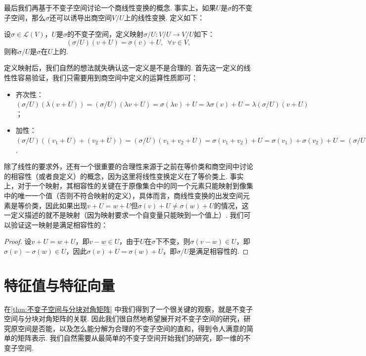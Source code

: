 最后我们再基于不变子空间讨论一个商线性变换的概念. 事实上，如果$U$是$\sigma$的不变子空间，那么$\sigma$还可以诱导出商空间$V/U$上的线性变换. 定义如下：
\begin{definition}{}{}
    设$\sigma\in \mathcal{L}(V)$，$U$是$\sigma$的不变子空间，定义映射$\sigma/U:V/U\to V/U$如下：
    \[(\sigma/U)(v+U)=\sigma(v)+U,\enspace\forall v\in V,\]
    则称$\sigma/U$是$\sigma$在$U$上的.
\end{definition}

定义映射后，我们自然的想法就失确认这一定义是不是合理的. 首先这一定义的线性性容易验证，我们只需要用到商空间中定义的运算性质即可：
\begin{itemize}
    \item 齐次性：$(\sigma/U)(\lambda(v+U))=(\sigma/U)(\lambda v+U)=\sigma(\lambda v)+U=\lambda\sigma(v)+U=\lambda(\sigma/U)(v+U)$；

    \item 加性：$(\sigma/U)((v_1+U)+(v_2+U))=(\sigma/U)(v_1+v_2+U)=\sigma(v_1+v_2)+U=\sigma(v_1)+\sigma(v_2)+U=(\sigma/U)(v_1+U)+(\sigma/U)(v_2+U)$.
\end{itemize}

除了线性的要求外，还有一个很重要的合理性来源于之前在等价类和商空间中讨论的相容性（或者良定义）的概念，因为这里将线性变换定义在了等价类上. 事实上，对于一个映射，其相容性的关键在于原像集合中的同一个元素只能映射到像集中的唯一一个值（否则不符合映射的定义），具体而言，商线性变换的出发空间元素是等价类，因此如果出现$v+U=w+U$但$\sigma(v)+U\neq \sigma(w)+U$的情况，这一定义描述的就不是映射（因为映射要求一个自变量只能映到一个值上）. 我们可以验证这一映射是满足相容性的：

\begin{proof}
    设$v+U=w+U$，即$v-w\in U$，由于$U$在$\sigma$下不变，则$\sigma(v-w)\in U$，即$\sigma(v)-\sigma(w)\in U$，因此$\sigma(v)+U=\sigma(w)+U$，即$\sigma/U$是满足相容性的.
\end{proof}

\section{特征值与特征向量}

在\autoref{thm:不变子空间与分块对角矩阵} 中我们得到了一个很关键的观察，就是不变子空间与分块对角矩阵的关联. 因此我们很自然地希望展开对不变子空间的研究，研究原空间是否能，以及怎么能分解为合理的不变子空间的直和，得到令人满意的简单的矩阵表示. 我们自然需要从最简单的不变子空间开始我们的研究，即一维的不变子空间.

